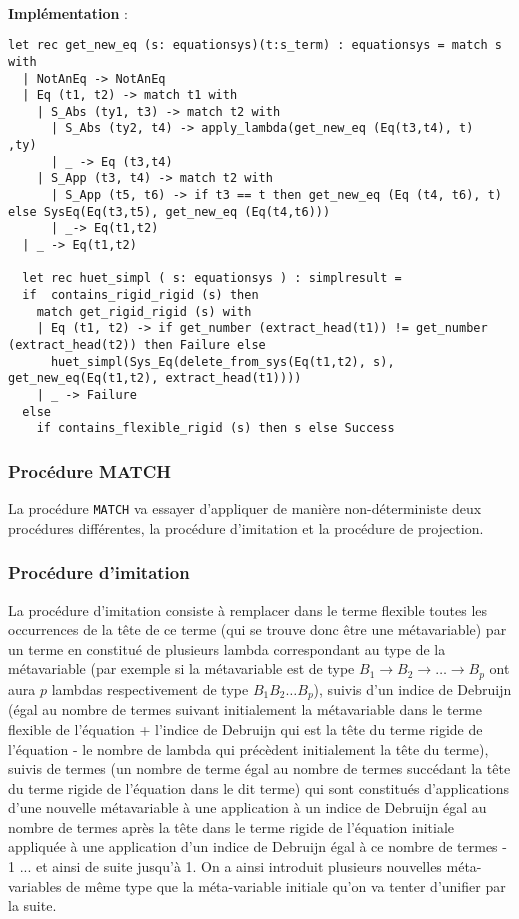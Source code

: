 \paragraph{}
\textbf{Implémentation} :
\begin{lstlisting}
let rec get_new_eq (s: equationsys)(t:s_term) : equationsys = match s with
  | NotAnEq -> NotAnEq
  | Eq (t1, t2) -> match t1 with
    | S_Abs (ty1, t3) -> match t2 with
      | S_Abs (ty2, t4) -> apply_lambda(get_new_eq (Eq(t3,t4), t)  ,ty)
      | _ -> Eq (t3,t4)
    | S_App (t3, t4) -> match t2 with
      | S_App (t5, t6) -> if t3 == t then get_new_eq (Eq (t4, t6), t) else SysEq(Eq(t3,t5), get_new_eq (Eq(t4,t6)))
      | _-> Eq(t1,t2)
  | _ -> Eq(t1,t2)

  let rec huet_simpl ( s: equationsys ) : simplresult = 
  if  contains_rigid_rigid (s) then
    match get_rigid_rigid (s) with
    | Eq (t1, t2) -> if get_number (extract_head(t1)) != get_number (extract_head(t2)) then Failure else
      huet_simpl(Sys_Eq(delete_from_sys(Eq(t1,t2), s), get_new_eq(Eq(t1,t2), extract_head(t1))))
    | _ -> Failure
  else
    if contains_flexible_rigid (s) then s else Success
\end{lstlisting}

\subsubsection{Procédure MATCH}
La procédure \verb?MATCH? va essayer d'appliquer de manière non-déterministe deux procédures différentes, la procédure d'imitation et la procédure de projection.

\subsubsection{Procédure d'imitation}
La procédure d'imitation consiste à remplacer dans le terme flexible toutes les occurrences de la tête de ce terme (qui se trouve donc être une métavariable) par un terme en \elnf{} constitué de plusieurs lambda correspondant au type de la métavariable (par exemple si la métavariable est de type $B_1\xrightarrow{}B_2\xrightarrow{}\dots\xrightarrow{}B_p$ ont aura $p$ lambdas respectivement de type $B_1B_2\dots B_p$), suivis d'un indice de Debruijn (égal au nombre de termes suivant initialement la métavariable dans le terme flexible de l'équation + l'indice de Debruijn qui est la tête du terme rigide de l'équation - le nombre de lambda qui précèdent initialement la tête du terme), suivis de termes (un nombre de terme égal au nombre de termes succédant la tête du terme rigide de l'équation dans le dit terme) qui sont constitués d'applications d'une nouvelle métavariable à une application à un indice de Debruijn égal au nombre de termes après la tête dans le terme rigide de l'équation initiale appliquée à une application d'un indice de Debruijn égal à ce nombre de termes - 1 ... et ainsi de suite jusqu'à 1. On a ainsi introduit plusieurs nouvelles méta-variables de même type que la méta-variable initiale qu'on va tenter d'unifier par la suite.

